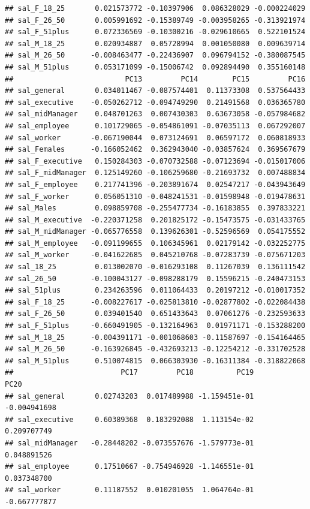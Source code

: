 \documentclass[]{article}
\begin{document}
\begin{verbatim}
## sal_F_18_25       0.021573772 -0.10397906  0.086328029 -0.000224029
## sal_F_26_50       0.005991692 -0.15389749 -0.003958265 -0.313921974
## sal_F_51plus      0.072336569 -0.10300216 -0.029610665  0.522101524
## sal_M_18_25       0.020934887  0.05728994  0.001050080  0.009639714
## sal_M_26_50      -0.008463477 -0.22436907  0.096794152 -0.380087545
## sal_M_51plus      0.053171099 -0.15006742  0.092894490  0.355160148
##                          PC13         PC14        PC15         PC16
## sal_general       0.034011467 -0.087574401  0.11373308  0.537564433
## sal_executive    -0.050262712 -0.094749290  0.21491568  0.036365780
## sal_midManager    0.048701263  0.007430303  0.63673058 -0.057984682
## sal_employee      0.101729065 -0.054861091 -0.07035113  0.067292007
## sal_worker       -0.067190044  0.073124691  0.06597172  0.060818933
## sal_Females      -0.166052462  0.362943040 -0.03857624  0.369567679
## sal_F_executive   0.150284303 -0.070732588 -0.07123694 -0.015017006
## sal_F_midManager  0.125149260 -0.106259680 -0.21693732  0.007488834
## sal_F_employee    0.217741396 -0.203891674  0.02547217 -0.043943649
## sal_F_worker      0.056051310 -0.048241531 -0.01598948 -0.019478631
## sal_Males         0.098859708 -0.255477734 -0.16183855  0.397833221
## sal_M_executive  -0.220371258  0.201825172 -0.15473575 -0.031433765
## sal_M_midManager -0.065776558  0.139626301 -0.52596569  0.054175552
## sal_M_employee   -0.091199655  0.106345961  0.02179142 -0.032252775
## sal_M_worker     -0.041622685  0.045210768 -0.07283739 -0.075671203
## sal_18_25         0.013002070 -0.016293108  0.11267039  0.136111542
## sal_26_50        -0.100043127 -0.098288179  0.15596215 -0.240473153
## sal_51plus        0.234263596  0.011064433  0.20197212 -0.010017352
## sal_F_18_25      -0.008227617 -0.025813810 -0.02877802 -0.022084438
## sal_F_26_50       0.039401540  0.651433643  0.07061276 -0.232593633
## sal_F_51plus     -0.660491905 -0.132164963  0.01971171 -0.153288200
## sal_M_18_25      -0.004391171 -0.001068603 -0.11587697 -0.154164465
## sal_M_26_50      -0.163926845 -0.432693213 -0.12254212 -0.331702528
## sal_M_51plus      0.510074815  0.066303930 -0.16311384 -0.318822068
##                         PC17         PC18          PC19         PC20
## sal_general       0.02743203  0.017489988 -1.159451e-01 -0.004941698
## sal_executive     0.60389368  0.183292088  1.113154e-02  0.209707749
## sal_midManager   -0.28448202 -0.073557676 -1.579773e-01  0.048891526
## sal_employee      0.17510667 -0.754946928 -1.146551e-01  0.037348700
## sal_worker        0.11187552  0.010201055  1.064764e-01 -0.667777877

\end{verbatim}
\end{document}
